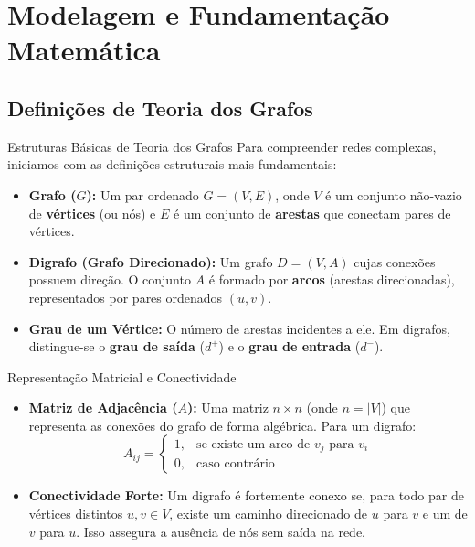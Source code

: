 \documentclass[aspectratio=1610,10pt]{beamer}
\begin{document}
\section{Modelagem e Fundamentação Matemática}
  
  \subsection{Definições de Teoria dos Grafos}

    \begin{frame}{Estruturas Básicas de Teoria dos Grafos}
      Para compreender redes complexas, iniciamos com as definições estruturais mais fundamentais:
      \vfill
      \begin{itemize}
        \setlength{\itemsep}{\medskipamount}
        \item \textbf{Grafo ($G$):} Um par ordenado $G = (V, E)$, onde $V$ é um conjunto não-vazio de \textbf{vértices} (ou nós) e $E$ é um conjunto de \textbf{arestas} que conectam pares de vértices.
        \item \textbf{Digrafo (Grafo Direcionado):} Um grafo $D = (V, A)$ cujas conexões possuem direção. O conjunto $A$ é formado por \textbf{arcos} (arestas direcionadas), representados por pares ordenados $(u, v)$.
        \item \textbf{Grau de um Vértice:} O número de arestas incidentes a ele. Em digrafos, distingue-se o \textbf{grau de saída} ($d^+$) e o \textbf{grau de entrada} ($d^-$).
      \end{itemize}
    \end{frame}

    \begin{frame}{Representação Matricial e Conectividade}
      \begin{itemize}
        \setlength{\itemsep}{\medskipamount}
        \item \textbf{Matriz de Adjacência ($A$):} Uma matriz $n \times n$ (onde $n = |V|$) que representa as conexões do grafo de forma algébrica. Para um digrafo:
          \begin{equation*}
             A_{ij} = \begin{cases} 1, & \text{se existe um arco de } v_j \text{ para } v_i \\ 0, & \text{caso contrário} \end{cases}
          \end{equation*}
        \item \textbf{Conectividade Forte:} Um digrafo é fortemente conexo se, para todo par de vértices distintos $u, v \in V$, existe um caminho direcionado de $u$ para $v$ e um de $v$ para $u$. Isso assegura a ausência de nós sem saída na rede.
      \end{itemize}
    \end{frame}
\end{document}
